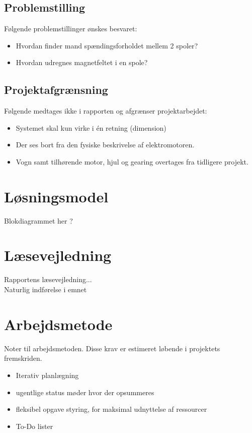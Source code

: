 \subsection{Problemstilling}
Følgende problemstillinger ønskes besvaret:
\begin{itemize}
\item Hvordan finder mand spændingsforholdet mellem 2 spoler?
\item Hvordan udregnes magnetfeltet i en spole?
\end{itemize}

\subsection{Projektafgrænsning}
Følgende medtages ikke i rapporten og afgrænser projektarbejdet:
\begin{itemize}
\item Systemet skal kun virke i én retning (dimension)
\item Der ses bort fra den fysiske beskrivelse af elektromotoren.
\item Vogn samt tilhørende motor, hjul og gearing overtages fra tidligere projekt.
\end{itemize}

\section{Løsningsmodel}
Blokdiagrammet her ?

\section{Læsevejledning}
Rapportens læsevejledning...\\
Naturlig indførelse i emnet

\section{Arbejdsmetode}
Noter til arbejdsmetoden.
Disse krav er estimeret løbende i projektets fremskriden.
\begin{itemize}
	\item Iterativ planlægning
	\item ugentlige status møder hvor der opsummeres
	\item fleksibel opgave styring, for maksimal udnyttelse af ressourcer 
	\item To-Do lister
\end{itemize}

